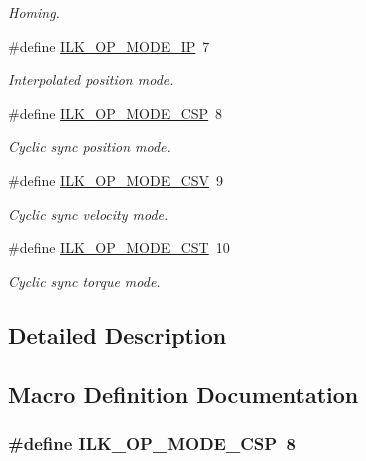 \begin{DoxyCompactItemize}
\begin{DoxyCompactList}\small\item\em Homing. \end{DoxyCompactList}\item 
\#define \hyperlink{group__IL__CONST__OP__MODE_ga35cf56e35484129095342ad889db552c}{I\+L\+K\+\_\+\+O\+P\+\_\+\+M\+O\+D\+E\+\_\+\+IP}~7
\begin{DoxyCompactList}\small\item\em Interpolated position mode. \end{DoxyCompactList}\item 
\#define \hyperlink{group__IL__CONST__OP__MODE_ga95c806de859172e9f09af0d620f15ec5}{I\+L\+K\+\_\+\+O\+P\+\_\+\+M\+O\+D\+E\+\_\+\+C\+SP}~8
\begin{DoxyCompactList}\small\item\em Cyclic sync position mode. \end{DoxyCompactList}\item 
\#define \hyperlink{group__IL__CONST__OP__MODE_gaaf121cd4e10a148b001f0a4d7cafae96}{I\+L\+K\+\_\+\+O\+P\+\_\+\+M\+O\+D\+E\+\_\+\+C\+SV}~9
\begin{DoxyCompactList}\small\item\em Cyclic sync velocity mode. \end{DoxyCompactList}\item 
\#define \hyperlink{group__IL__CONST__OP__MODE_ga336b0e7a48565b41d3b67cc4527b6298}{I\+L\+K\+\_\+\+O\+P\+\_\+\+M\+O\+D\+E\+\_\+\+C\+ST}~10
\begin{DoxyCompactList}\small\item\em Cyclic sync torque mode. \end{DoxyCompactList}\end{DoxyCompactItemize}


\subsection{Detailed Description}


\subsection{Macro Definition Documentation}
\subsubsection[{\texorpdfstring{I\+L\+K\+\_\+\+O\+P\+\_\+\+M\+O\+D\+E\+\_\+\+C\+SP}{ILK_OP_MODE_CSP}}]{\setlength{\rightskip}{0pt plus 5cm}\#define I\+L\+K\+\_\+\+O\+P\+\_\+\+M\+O\+D\+E\+\_\+\+C\+SP~8}\hypertarget{group__IL__CONST__OP__MODE_ga95c806de859172e9f09af0d620f15ec5}{}\label{group__IL__CONST__OP__MODE_ga95c806de859172e9f09af0d620f15ec5}


